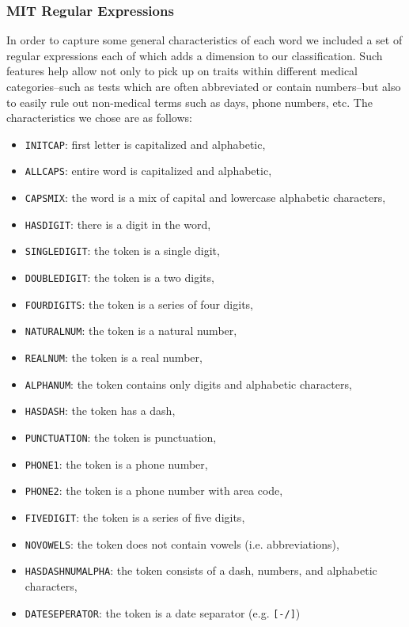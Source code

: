 \documentclass[preprint]{style}
\begin{document}
\subsubsection{MIT Regular Expressions}
In order to capture some general characteristics of each word we included a set of regular expressions each of which adds a dimension to our classification. Such features help allow not only to pick up on traits within different medical categories--such as tests which are often abbreviated or contain numbers--but also to easily rule out non-medical terms such as days, phone numbers, etc. The characteristics we chose are as follows:
\begin{itemize}
\item {\tt INITCAP}: first letter is capitalized and alphabetic,
\item {\tt ALLCAPS}: entire word is capitalized and alphabetic,
\item {\tt CAPSMIX}: the word is a mix of capital and lowercase alphabetic characters,
\item {\tt HASDIGIT}: there is a digit in the word,
\item {\tt SINGLEDIGIT}: the token is a single digit,
\item {\tt DOUBLEDIGIT}: the token is a two digits,
\item {\tt FOURDIGITS}: the token is a series of four digits,
\item {\tt NATURALNUM}: the token is a natural number,
\item {\tt REALNUM}: the token is a real number,
\item {\tt ALPHANUM}: the token contains only digits and alphabetic characters,
\item {\tt HASDASH}: the token has a dash,
\item {\tt PUNCTUATION}: the token is punctuation,
\item {\tt PHONE1}: the token is a phone number,
\item {\tt PHONE2}: the token is a phone number with area code,
\item {\tt FIVEDIGIT}: the token is a series of five digits,
\item {\tt NOVOWELS}: the token does not contain vowels (i.e. abbreviations),
\item {\tt HASDASHNUMALPHA}: the token consists of a dash, numbers, and alphabetic characters, 
\item {\tt DATESEPERATOR}: the token is a date separator (e.g. {\tt [-/]})
\end{itemize}
\end{document}
